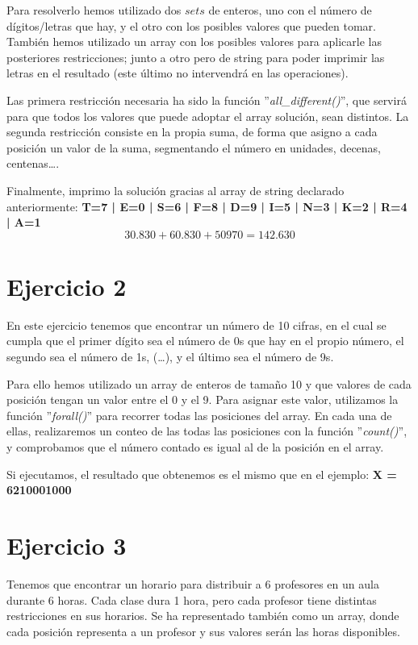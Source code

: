 \documentclass[11pt,a4paper]{article}
\begin{document}
Para resolverlo hemos utilizado dos $sets$ de enteros, uno con el número de dígitos/letras que hay, y el otro con los posibles valores que pueden
tomar. También hemos utilizado un array con los posibles valores para aplicarle las posteriores restricciones; junto a otro pero de string para
poder imprimir las letras en el resultado (este último no intervendrá en las operaciones).

Las primera restricción necesaria ha sido la función ''\textit{all\_different()}'', que servirá para que todos los valores que puede adoptar el
array solución, sean distintos. La segunda restricción consiste en la propia suma, de forma que asigno a cada posición un valor de la suma,
segmentando el número en unidades, decenas, centenas\dots.

Finalmente, imprimo la solución gracias al array de string declarado anteriormente: \textbf{T=7 | E=0 | S=6 | F=8 | D=9 | I=5 | N=3 | K=2 | R=4 |
A=1}
\begin{equation*}
    30.830 + 60.830 + 50970 = 142.630
\end{equation*}



\section*{Ejercicio 2}
En este ejercicio tenemos que encontrar un número de 10 cifras, en el cual se cumpla que el primer dígito sea el número de 0s que hay en el propio
número, el segundo sea el número de 1s, (\dots), y el último sea el número de 9s.

Para ello hemos utilizado un array de enteros de tamaño 10 y que valores de cada posición tengan un valor entre el 0 y el 9. Para asignar este
valor, utilizamos la función ''\textit{forall()}'' para recorrer todas las posiciones del array. En cada una de ellas, realizaremos un conteo
de las todas las posiciones con la función ''\textit{count()}'', y comprobamos que el número contado es igual al de la posición en el array.

Si ejecutamos, el resultado que obtenemos es el mismo que en el ejemplo: \textbf{X = 6210001000}



\section*{Ejercicio 3}
Tenemos que encontrar un horario para distribuir a 6 profesores en un aula durante 6 horas. Cada clase dura 1 hora, pero cada profesor tiene
distintas restricciones en sus horarios. Se ha representado también como un array, donde cada posición representa a un profesor y sus valores
serán las horas disponibles.
\end{document}
